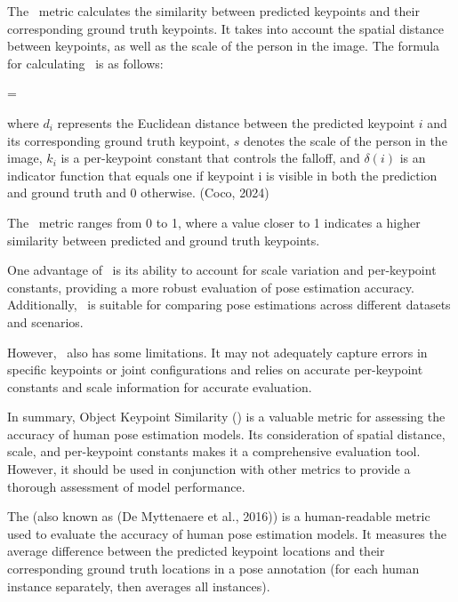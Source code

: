 The \OKS\ metric calculates the similarity between predicted keypoints and their corresponding ground truth keypoints. It takes into account the spatial distance between keypoints, as well as the scale of the person in the image. The formula for calculating \OKS\ is as follows:

\startplaceformula[reference=oks]
 \startformula \mbox{\OKS} = 
 \stopformula
\stopplaceformula

where $ d_i $ represents the Euclidean distance between the predicted keypoint $ i $ and its corresponding ground truth keypoint, $ s $ denotes the scale of the person in the image, $ k_i $ is a per-keypoint constant that controls the falloff, and $ \delta(i) $ is an indicator function that equals one if keypoint i is visible in both the prediction and ground truth and 0 otherwise. (\scc Coco, 2024)

The \OKS\ metric ranges from 0 to 1, where a value closer to 1 indicates a higher similarity between predicted and ground truth keypoints.

One advantage of \OKS\ is its ability to account for scale variation and per-keypoint constants, providing a more robust evaluation of pose estimation accuracy. Additionally, \OKS\ is suitable for comparing pose estimations across different datasets and scenarios.

However, \OKS\ also has some limitations. It may not adequately capture errors in specific keypoints or joint configurations and relies on accurate per-keypoint constants and scale information for accurate evaluation.

In summary, Object Keypoint Similarity (\OKS) is a valuable metric for assessing the accuracy of human pose estimation models. Its consideration of spatial distance, scale, and per-keypoint constants makes it a comprehensive evaluation tool. However, it should be used in conjunction with other metrics to provide a thorough assessment of model performance.

The \pojem{\APE} (also known as  (\scc De Myttenaere et al., 2016)) is a human-readable metric used to evaluate the accuracy of human pose estimation models. It measures the average difference between the predicted keypoint locations and their corresponding ground truth locations in a pose annotation (for each human instance separately, then averages all instances).

